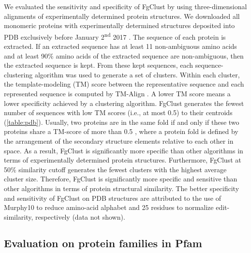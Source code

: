 \documentclass[11pt,letterpaper]{llncs2e/llncs}
\begin{document}
We evaluated the sensitivity and specificity of FgClust by using three-dimensional alignments of experimentally determined protein structures.
We downloaded all monomeric proteins with experimentally determined structures deposited into PDB exclusively before January 2\textsuperscript{nd} 2017 \citep{berman2006protein}.
The sequence of each protein is extracted.
If an extracted sequence has at least 11 non-ambiguous amino acids and at least 90\% amino acids of the extracted sequence are non-ambiguous, then the extracted sequence is kept.
From these kept sequences, each sequence-clustering algorithm was used to generate a set of clusters.
Within each cluster, the template-modeling (TM) score between the representative sequence and each represented sequence is computed by TM-Align \citep{zhang2005tm}.
A lower TM score means a lower specificity achieved by a clustering algorithm.
FgClust generates the fewest number of sequences with low TM scores (i.e., at most 0.5) to their centroids (\cref{table:pdb}).
Usually, two proteins are in the same fold if and only if these two proteins share a TM-score of more than 0.5 \citep{xu2010significant}, where a protein fold is defined by the arrangement of the secondary structure elements relative to each other in space.
As a result, FgClust is significantly more specific than other algorithms in terms of experimentally determined protein structures.
Furthermore, FgClust at 50\% similarity cutoff generates the fewest clusters with the highest average cluster size.
Therefore, FgClust is significantly more specific and sensitive than other algorithms in terms of protein structural similarity.
The better specificity and sensitivity of FgClust on PDB structures are attributed to the use of Murphy10 to reduce amino-acid alphabet and 25 residues to normalize edit-similarity, respectively (data not shown).

\subsection{Evaluation on protein families in Pfam}
\end{document}
